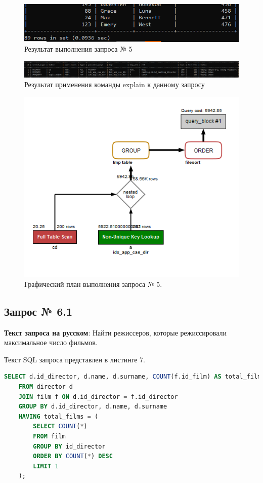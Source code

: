 \documentclass[11pt,a4paper,final]{article} %
\begin{document}
\begin{figure}[H]
	\centering
	\includegraphics[width=0.7\linewidth]{52.png}
	\caption{Результат выполнения запроса № 5}
	\label{fig:52}
\end{figure}

\begin{figure}[H]
	\centering
	\includegraphics[width=1.0\linewidth]{e5.png}
	\caption{Результат применения команды explain к данному запросу}
	\label{fig:e5}
\end{figure}

\begin{figure}[H]
	\centering
	\includegraphics[width=0.65\linewidth]{ex5.png}
	\caption{Графический план выполнения запроса № 5.}
	\label{fig:ex5}
\end{figure}
\newpage
\subsection{Запрос № 6.1}

\par \textbf{Текст запроса на русском}: Найти режиссеров, которые режиссировали максимальное число фильмов. 
\par Текст SQL запроса представлен в листинге 7.

\begin{lstlisting}[caption=SQL запрос № 6.1, language=SQL]
    SELECT d.id_director, d.name, d.surname, COUNT(f.id_film) AS total_films
    FROM director d
    JOIN film f ON d.id_director = f.id_director
    GROUP BY d.id_director, d.name, d.surname
    HAVING total_films = (
        SELECT COUNT(*)
        FROM film
        GROUP BY id_director
        ORDER BY COUNT(*) DESC
        LIMIT 1
    );
\end{lstlisting}
\end{document}
